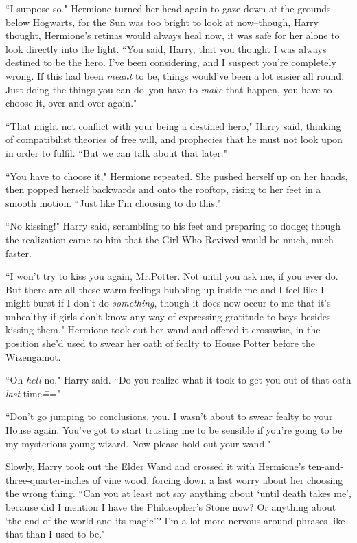 ``I suppose so." Hermione turned her head again to gaze down at the grounds below Hogwarts, for the Sun was too bright to look at now\---though, Harry thought, Hermione's retinas would always heal now, it was safe for her alone to look directly into the light. ``You said, Harry, that you thought I was always destined to be the hero. I've been considering, and I suspect you're completely wrong. If this had been \emph{meant} to be, things would've been a lot easier all round. Just doing the things you can do\---you have to \emph{make} that happen, you have to choose it, over and over again."

``That might not conflict with your being a destined hero," Harry said, thinking of compatibilist theories of free will, and prophecies that he must not look upon in order to fulfil. ``But we can talk about that later."

``You have to choose it," Hermione repeated. She pushed herself up on her hands, then popped herself backwards and onto the rooftop, rising to her feet in a smooth motion. ``Just like I'm choosing to do this."

``No kissing!" Harry said, scrambling to his feet and preparing to dodge; though the realization came to him that the Girl-Who-Revived would be much, much faster.

``I won't try to kiss you again, Mr.\?Potter. Not until you ask me, if you ever do. But there are all these warm feelings bubbling up inside me and I feel like I might burst if I don't do \emph{something}, though it does now occur to me that it's unhealthy if girls don't know any way of expressing gratitude to boys besides kissing them." Hermione took out her wand and offered it crosswise, in the position she'd used to swear her oath of fealty to House Potter before the Wizengamot.

``Oh \emph{hell} no," Harry said. ``Do you realize what it took to get you out of that oath \emph{last} time\==="

``Don't go jumping to conclusions, you. I wasn't about to swear fealty to your House again. You've got to start trusting me to be sensible if you're going to be my mysterious young wizard. Now please hold out your wand."

Slowly, Harry took out the Elder Wand and crossed it with Hermione's ten-and-three-quarter-inches of vine wood, forcing down a last worry about her choosing the wrong thing. ``Can you at least not say anything about `until death takes me', because did I mention I have the Philosopher's Stone now? Or anything about `the end of the world and its magic'? I'm a lot more nervous around phrases like that than I used to be."

